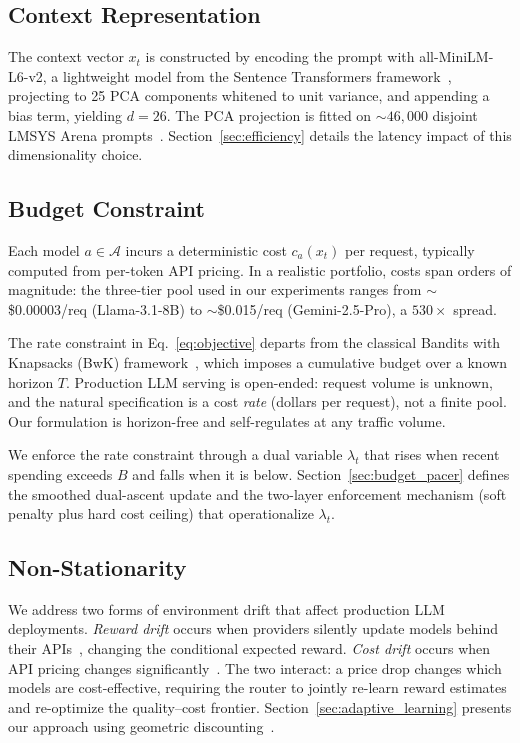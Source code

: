\subsection{Context Representation}
\label{sec:context_repr}

The context vector $x_t$ is constructed by encoding the prompt with all-MiniLM-L6-v2, a lightweight model from the Sentence Transformers framework~\cite{reimers2019sentence}, projecting to 25 PCA components whitened to unit variance, and appending a bias term, yielding $d = 26$. The PCA projection is fitted on ${\sim}46{,}000$ disjoint LMSYS Arena prompts~\cite{zheng2023judging}. Section~\ref{sec:efficiency} details the latency impact of this dimensionality choice.

\subsection{Budget Constraint}
\label{sec:budget_constraint}

Each model $a \in \mathcal{A}$ incurs a deterministic cost $c_a(x_t)$ per request, typically computed from per-token API pricing. In a realistic portfolio, costs span orders of magnitude: the three-tier pool used in our experiments ranges from ${\sim}$\$0.00003/req (Llama-3.1-8B) to ${\sim}$\$0.015/req (Gemini-2.5-Pro), a $530{\times}$ spread.

The rate constraint in Eq.~\ref{eq:objective} departs from the classical Bandits with Knapsacks (BwK) framework~\cite{badanidiyuru2013bwk}, which imposes a cumulative budget over a known horizon $T$. Production LLM serving is open-ended: request volume is unknown, and the natural specification is a cost \emph{rate} (dollars per request), not a finite pool. Our formulation is horizon-free and self-regulates at any traffic volume.

We enforce the rate constraint through a dual variable $\lambda_t$ that rises when recent spending exceeds $B$ and falls when it is below. Section~\ref{sec:budget_pacer} defines the smoothed dual-ascent update and the two-layer enforcement mechanism (soft penalty plus hard cost ceiling) that operationalize $\lambda_t$.

\subsection{Non-Stationarity}
\label{sec:nonstationarity}

We address two forms of environment drift that affect production LLM deployments. \emph{Reward drift} occurs when providers silently update models behind their APIs~\cite{chen2023chatgptdrift, ma2024prompt}, changing the conditional expected reward. \emph{Cost drift} occurs when API pricing changes significantly~\cite{openai2024gpt4opricing}. The two interact: a price drop changes which models are cost-effective, requiring the router to jointly re-learn reward estimates and re-optimize the quality--cost frontier. Section~\ref{sec:adaptive_learning} presents our approach using geometric discounting~\cite{garivier2011switching, russac2019weighted}.
